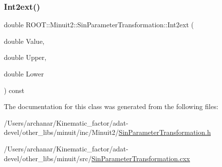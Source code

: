 \subsubsection{\texorpdfstring{Int2ext()}{Int2ext()}\hspace{0.1cm}{\footnotesize\ttfamily [3/3]}}
{\footnotesize\ttfamily double R\+O\+O\+T\+::\+Minuit2\+::\+Sin\+Parameter\+Transformation\+::\+Int2ext (\begin{DoxyParamCaption}\item[{double}]{Value,  }\item[{double}]{Upper,  }\item[{double}]{Lower }\end{DoxyParamCaption}) const}



The documentation for this class was generated from the following files\+:\begin{DoxyCompactItemize}
\item 
/\+Users/archanar/\+Kinematic\+\_\+factor/adat-\/devel/other\+\_\+libs/minuit/inc/\+Minuit2/\mbox{\hyperlink{adat-devel_2other__libs_2minuit_2inc_2Minuit2_2SinParameterTransformation_8h}{Sin\+Parameter\+Transformation.\+h}}\item 
/\+Users/archanar/\+Kinematic\+\_\+factor/adat-\/devel/other\+\_\+libs/minuit/src/\mbox{\hyperlink{adat-devel_2other__libs_2minuit_2src_2SinParameterTransformation_8cxx}{Sin\+Parameter\+Transformation.\+cxx}}\end{DoxyCompactItemize}
